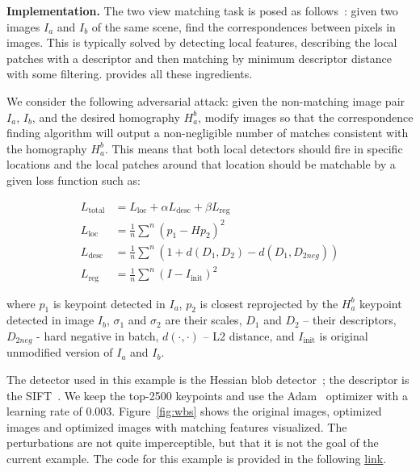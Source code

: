 \textbf{Implementation.}
The two view matching task is posed as follows~\citep{Pritchett1998}: given two images $I_{a}$ and $I_{b}$ of the same scene, find the correspondences between pixels in images. This is typically solved by detecting local features, describing the local patches with a descriptor and then matching by minimum descriptor distance with some filtering. \lib{} provides all these ingredients. 

We consider the following adversarial attack: given the non-matching image pair $I_{a}$, $I_{b}$, and the desired homography $H_a^b$, modify images so that the correspondence finding algorithm will output a non-negligible number of matches consistent with the homography $H_a^b$. This means that both local detectors should fire in specific locations and the local patches around that location should be matchable by a given loss function such as:

\begin{align}
	\label{eq:adversarial:loss total}
	L_{\text{total}} &= L_{\text{loc}} + \alpha L_{\text{desc}} + \beta L_{\text{reg}}\\
	\label{eq:adversarial:loss loc}
	L_{\text{loc}} &= \frac{1}{n} \sum\limits^{n} (p_1 - H p_2)^2 \\
   \label{eq:adversarial:loss desc}
	L_{\text{desc}} &= \frac{1}{n} \sum\limits^{n} (1 + d(D_1, D_2) - d(D_1, D_{2neg})) \\
	\label{eq:adversarial:loss reg}
	L_{\text{reg}} &= \frac{1}{n} \sum\limits^{n} (I - I_{\text{init}})^2 
\end{align}

\noindent where $p_1$ is keypoint detected in $I_a$, $p_2$ is closest reprojected by the $H_a^b$ keypoint detected in image $I_b$, $\sigma_1$ and $\sigma_2$ are their scales, $D_1$ and $D_2$ -- their descriptors, $D_{2neg}$ - hard negative in batch, $d(\cdot, \cdot)$ -- L2 distance, and $I_{\text{init}}$ is original unmodified version of $I_a$ and $I_b$.

The detector used in this example is the Hessian blob detector~\citep{Hessian78}; the descriptor is the SIFT~\citep{Lowe2004}. We keep the top-2500 keypoints and use the Adam~\citep{adam2015} optimizer with a learning rate of 0.003. 
Figure~\ref{fig:wbs} shows the original images, optimized images and optimized images with matching features visualized.  The perturbations are not quite imperceptible, but that it is not the goal of the current example. The code for this example is provided in the following \underline{\color{blue}\href{https://github.com/kornia/kornia-examples/blob/master/local-feature-adversarial-attack.ipynb}{link}}.

